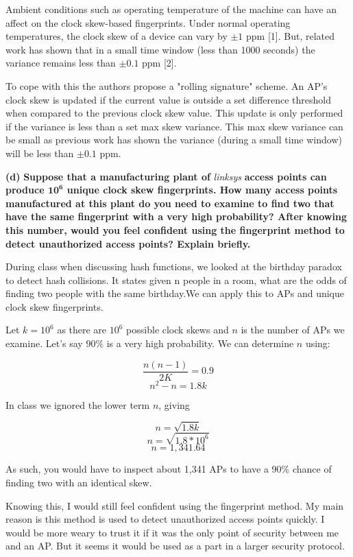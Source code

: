 \documentclass[11pt]{article}
\renewcommand\part[1]{\vspace{.10in}\textbf{(#1)}}
\begin{document}
Ambient conditions such as operating temperature of the machine can have an affect on the clock skew-based fingerprints. Under normal operating temperatures, the clock skew of a device can vary by $\pm1$ ppm [1]. But, related work has shown that in a small time window (less than 1000 seconds) the variance remains less than $\pm0.1$ ppm [2].

To cope with this the authors propose a "rolling signature" scheme. An AP's clock skew is updated if the current value is outside a set difference threshold when compared to the previous clock skew value. This update is only performed if the variance is less than a set max skew variance. This max skew variance can be small as previous work has shown the variance (during a small time window) will be less than $\pm0.1$ ppm.

\part{d} \textbf{Suppose that a manufacturing plant of} \textit{linksys} \textbf{access points can produce $\mathbf{10^6}$ unique clock skew fingerprints. How many access points manufactured at this plant do you need to examine to find two that have the same fingerprint with a very high probability? After knowing this number, would you feel confident using the fingerprint method to detect unauthorized access points? Explain briefly.}

During class when discussing hash functions, we looked at the birthday paradox to detect hash collisions. It states given n people in a room, what are the odds of finding two people with the same birthday.We can apply this to APs and unique clock skew fingerprints.

Let $k = 10^6$ as there are $10^6$ possible clock skews and $n$ is the number of APs we examine. Let's say $90\%$ is a very high probability. We can determine $n$ using:

$$\frac{n(n-1)}{2K} = 0.9$$
$$n^2 - n = 1.8k$$

In class we ignored the lower term $n$, giving

$$n = \sqrt{1.8k}$$
$$n = \sqrt{1.8 * 10^6}$$
$$n = 1,341.64$$

As such, you would have to inspect about 1,341 APs to have a $90\%$ chance of finding two with an identical skew.

Knowing this, I would still feel confident using the fingerprint method. My main reason is this method is used to detect unauthorized access points quickly. I would be more weary to trust it if it was the only point of security between me and an AP. But it seems it would be used as a part in a larger security protocol. 
\end{document}
